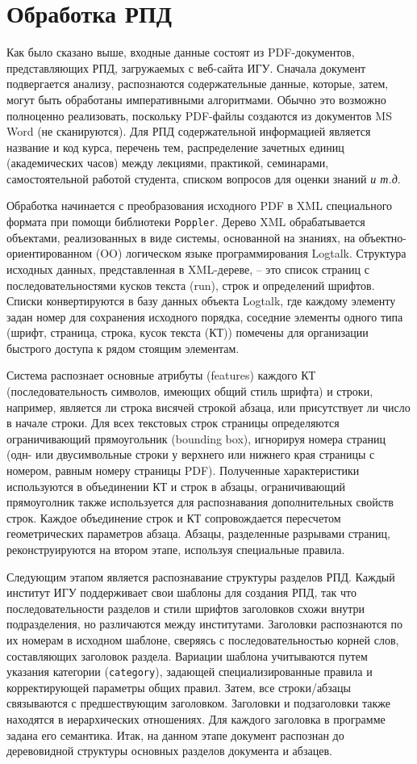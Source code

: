 \documentclass[
]{aiitart}
\begin{document}
\section{Обработка РПД}

Как было сказано выше, входные данные состоят из PDF-документов, представляющих РПД, загружаемых с веб-сайта ИГУ. Сначала документ подвергается анализу, распознаются содержательные данные, которые, затем, могут быть обработаны императивными алгоритмами. Обычно это возможно полноценно реализовать, поскольку PDF-файлы создаются из документов MS Word (не сканируются). Для РПД содержательной информацией является название и код курса, перечень тем, распределение зачетных единиц (академических часов) между лекциями, практикой, семинарами, самостоятельной работой студента, списком вопросов для оценки знаний \emph{и т.д}.

Обработка начинается с преобразования исходного PDF в XML специального формата при помощи библиотеки \verb|Poppler|. Дерево XML обрабатывается объектами, реализованных в виде системы, основанной на знаниях, на \cite{logtalk} объектно-ориентированном (OO) логическом языке программирования Logtalk. Структура исходных данных, представленная в XML-дереве, -- это список страниц с последовательностями кусков текста (run), строк и определений шрифтов. Списки конвертируются в базу данных объекта Logtalk, где каждому элементу задан номер для сохранения исходного порядка, соседние элементы одного типа (шрифт, страница, строка, кусок текста (КТ)) помечены для организации быстрого доступа к рядом стоящим элементам.

Система распознает основные атрибуты (features) каждого КТ (последовательность символов, имеющих общий стиль шрифта) и строки, например, является ли строка висячей строкой абзаца, или присутствует ли число в начале строки. Для всех текстовых строк страницы определяются ограничивающий прямоугольник (bounding box), игнорируя номера страниц (одн- или двусимвольные строки у верхнего или нижнего края страницы с номером, равным номеру страницы PDF). Полученные характеристики используются в объединении КТ и строк в абзацы, ограничивающий прямоуголник также используется для распознавания дополнительных свойств строк. Каждое объединение строк и КТ сопровождается пересчетом геометрических параметров абзаца. Абзацы, разделенные разрывами страниц, реконструируются на втором этапе, используя специальные правила.

Следующим этапом является распознавание структуры разделов РПД. Каждый институт ИГУ поддерживает свои шаблоны для создания РПД, так что последовательности разделов и стили шрифтов заголовков схожи внутри подразделения, но различаются между институтами. Заголовки распознаются по их номерам в исходном шаблоне, сверяясь с последовательностью корней слов, составляющих заголовок раздела. Вариации шаблона учитываются путем указания категории (\verb|category|), задающей специализированные правила и корректирующей параметры общих правил. Затем, все строки/абзацы связываются с предшествующим заголовком. Заголовки и подзаголовки также находятся в иерархических отношениях.  Для каждого заголовка в программе задана его семантика. Итак, на данном этапе документ распознан до деревовидной структуры основных разделов документа и абзацев.
\end{document}
